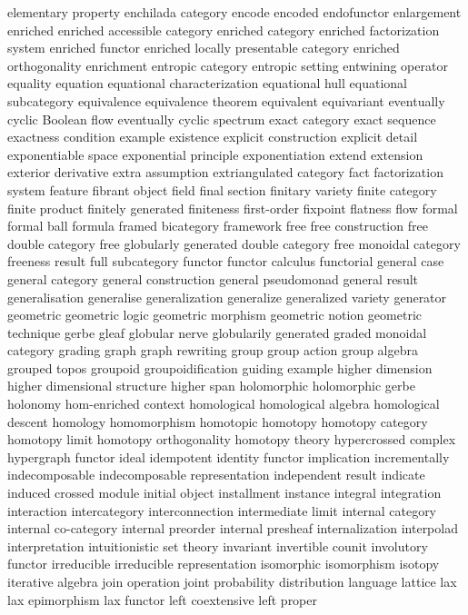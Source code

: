 elementary property
enchilada category
encode
encoded
endofunctor
enlargement
enriched
enriched accessible category
enriched category
enriched factorization system
enriched functor
enriched locally presentable category
enriched orthogonality
enrichment
entropic category
entropic setting
entwining operator
equality
equation
equational characterization
equational hull
equational subcategory
equivalence
equivalence theorem
equivalent
equivariant
eventually cyclic Boolean flow
eventually cyclic spectrum
exact category
exact sequence
exactness condition
example
existence
explicit construction
explicit detail
exponentiable space
exponential principle
exponentiation
extend
extension
exterior derivative
extra assumption
extriangulated category
fact
factorization system
feature
fibrant object
field
final section
finitary variety
finite category
finite product
finitely generated
finiteness
first-order
fixpoint
flatness
flow
formal
formal ball
formula
framed bicategory
framework
free
free construction
free double category
free globularly generated double category
free monoidal category
freeness result
full subcategory
functor
functor calculus
functorial
general case
general category
general construction
general pseudomonad
general result
generalisation
generalise
generalization
generalize
generalized variety
generator
geometric
geometric logic
geometric morphism
geometric notion
geometric technique
gerbe
gleaf
globular nerve
globularily generated
graded monoidal category
grading
graph
graph rewriting
group
group action
group algebra
grouped topos
groupoid
groupoidification
guiding example
higher dimension
higher dimensional structure
higher span
holomorphic
holomorphic gerbe
holonomy
hom-enriched context
homological
homological algebra
homological descent
homology
homomorphism
homotopic
homotopy
homotopy category
homotopy limit
homotopy orthogonality
homotopy theory
hypercrossed complex
hypergraph functor
ideal
idempotent
identity functor
implication
incrementally
indecomposable
indecomposable representation
independent result
indicate
induced crossed module
initial object
installment
instance
integral
integration
interaction
intercategory
interconnection
intermediate limit
internal category
internal co-category
internal preorder
internal presheaf
internalization
interpolad
interpretation
intuitionistic set theory
invariant
invertible counit
involutory functor
irreducible
irreducible representation
isomorphic
isomorphism
isotopy
iterative algebra
join operation
joint probability distribution
language
lattice
lax
lax epimorphism
lax functor
left coextensive
left proper
